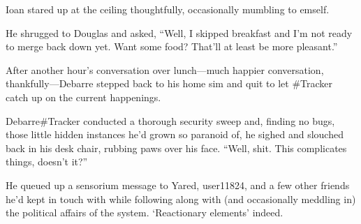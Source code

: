 Ioan stared up at the ceiling thoughtfully, occasionally mumbling to emself.

He shrugged to Douglas and asked, ``Well, I skipped breakfast and I'm not ready to merge back down yet. Want some food? That'll at least be more pleasant.''

After another hour's conversation over lunch—much happier conversation, thankfully—Debarre stepped back to his home sim and quit to let \#Tracker catch up on the current happenings.

Debarre\#Tracker conducted a thorough security sweep and, finding no bugs, those little hidden instances he'd grown so paranoid of, he sighed and slouched back in his desk chair, rubbing paws over his face. ``Well, shit. This complicates things, doesn't it?''

He queued up a sensorium message to Yared, user11824, and a few other friends he'd kept in touch with while following along with (and occasionally meddling in) the political affairs of the system. `Reactionary elements' indeed.
